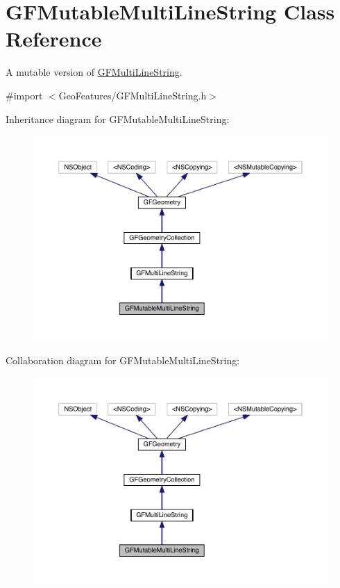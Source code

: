 \hypertarget{interface_g_f_mutable_multi_line_string}{}\section{G\+F\+Mutable\+Multi\+Line\+String Class Reference}
\label{interface_g_f_mutable_multi_line_string}


A mutable version of \hyperlink{interface_g_f_multi_line_string}{G\+F\+Multi\+Line\+String}.  




{\ttfamily \#import $<$Geo\+Features/\+G\+F\+Multi\+Line\+String.\+h$>$}



Inheritance diagram for G\+F\+Mutable\+Multi\+Line\+String\+:\nopagebreak
\begin{figure}[H]
\begin{center}
\leavevmode
\includegraphics[width=350pt]{interface_g_f_mutable_multi_line_string__inherit__graph}
\end{center}
\end{figure}


Collaboration diagram for G\+F\+Mutable\+Multi\+Line\+String\+:\nopagebreak
\begin{figure}[H]
\begin{center}
\leavevmode
\includegraphics[width=350pt]{interface_g_f_mutable_multi_line_string__coll__graph}
\end{center}
\end{figure}
